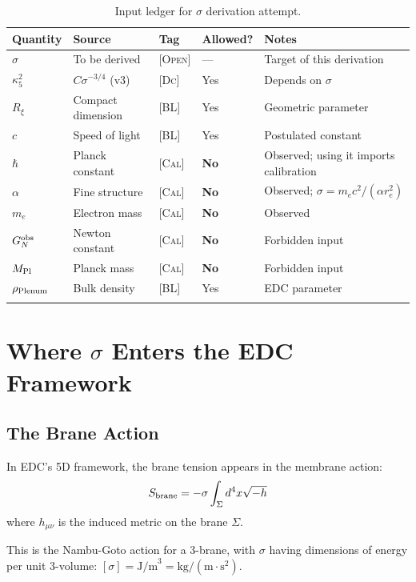\documentclass[11pt,a4paper]{article}
\newcommand{\BL}{\textsc{[BL]}}
\newcommand{\Deriv}{\textsc{[Dc]}}
\newcommand{\Cal}{\textsc{[Cal]}}
\newcommand{\Open}{\textsc{[Open]}}
\begin{document}
\begin{longtable}{p{2.5cm}p{3cm}p{1.5cm}p{1.5cm}p{4cm}}
\toprule
\textbf{Quantity} & \textbf{Source} & \textbf{Tag} & \textbf{Allowed?} & \textbf{Notes} \\
\midrule
\endhead
$\sigma$ & To be derived & \Open & --- & Target of this derivation \\
$\kappa_5^2$ & $C \sigma^{-3/4}$ (v3) & \Deriv & Yes & Depends on $\sigma$ \\
$R_\xi$ & Compact dimension & \BL & Yes & Geometric parameter \\
$c$ & Speed of light & \BL & Yes & Postulated constant \\
$\hbar$ & Planck constant & \Cal & \textbf{No} & Observed; using it imports calibration \\
$\alpha$ & Fine structure & \Cal & \textbf{No} & Observed; $\sigma = m_e c^2/(\alpha r_e^2)$ \\
$m_e$ & Electron mass & \Cal & \textbf{No} & Observed \\
$G_N^{\rm obs}$ & Newton constant & \Cal & \textbf{No} & Forbidden input \\
$M_{\rm Pl}$ & Planck mass & \Cal & \textbf{No} & Forbidden input \\
$\rho_{\rm Plenum}$ & Bulk density & \BL & Yes & EDC parameter \\
\bottomrule
\caption{Input ledger for $\sigma$ derivation attempt.}
\label{tab:inputs}
\end{longtable}

\section{Where $\sigma$ Enters the EDC Framework}

\subsection{The Brane Action}

In EDC's 5D framework, the brane tension appears in the membrane action:
\begin{equation}
S_{\rm brane} = -\sigma \int_{\Sigma} d^4x \sqrt{-h}
\label{eq:brane_action}
\end{equation}
where $h_{\mu\nu}$ is the induced metric on the brane $\Sigma$.

This is the Nambu-Goto action for a 3-brane, with $\sigma$ having dimensions
of energy per unit 3-volume: $[\sigma] = \text{J/m}^3 = \text{kg}/(\text{m}\cdot\text{s}^2)$.
\end{document}
